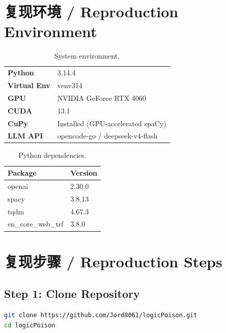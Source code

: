 \documentclass[11pt,a4paper]{article}
\begin{document}
\section{复现环境 / Reproduction Environment}

\begin{table}[H]
\centering
\begin{tabular}{>{\bfseries}l l}
\toprule
Python          & 3.14.4 \\
Virtual Env     & venv314 \\
GPU             & NVIDIA GeForce RTX 4060 \\
CUDA            & 13.1 \\
CuPy            & Installed (GPU-accelerated spaCy) \\
LLM API         & opencode-go / deepseek-v4-flash \\
\bottomrule
\end{tabular}
\caption{System environment.}
\end{table}

\begin{table}[H]
\centering
\begin{tabular}{l l}
\toprule
\textbf{Package} & \textbf{Version} \\
\midrule
openai           & 2.30.0 \\
spacy            & 3.8.13 \\
tqdm             & 4.67.3 \\
en\_core\_web\_trf & 3.8.0 \\
\bottomrule
\end{tabular}
\caption{Python dependencies.}
\end{table}

\section{复现步骤 / Reproduction Steps}

\subsection{Step 1: Clone Repository}

\begin{lstlisting}[language=bash]
git clone https://github.com/Jord8061/logicPoison.git
cd logicPoison
\end{lstlisting}
\end{document}
